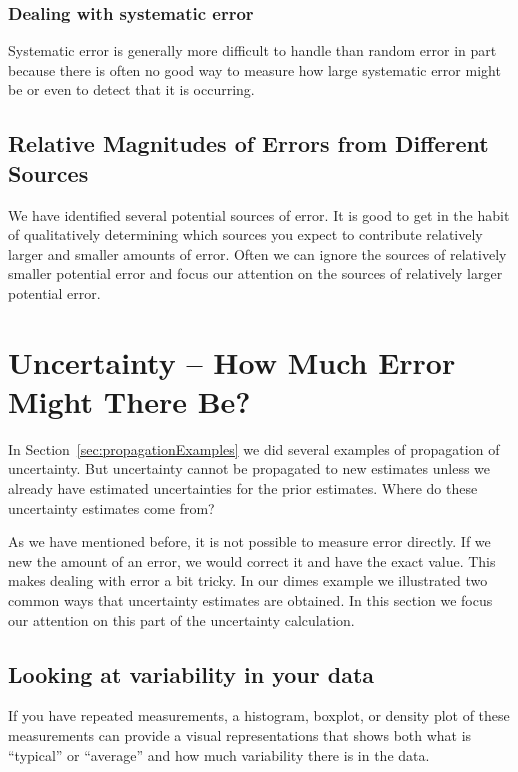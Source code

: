 \documentclass[twoside]{book}\usepackage[]{graphicx}\usepackage[]{xcolor}
\newcounter{example}[section]
\begin{document}
\subsubsection{Dealing with systematic error}
Systematic error is generally more difficult to handle than random error in
part because there is often no good way to measure how large systematic error
might be or even to detect that it is occurring.

\subsection{Relative Magnitudes of Errors from Different Sources}

We have identified several potential sources of error.  
It is good to get in the habit of qualitatively determining which sources you expect to contribute
relatively larger and smaller amounts of error.  Often we can ignore the sources of relatively
smaller potential error and focus our attention on the sources of relatively larger potential
error.


\section{Uncertainty -- How Much Error Might There Be?}

In Section~\ref{sec:propagationExamples} we did several examples of propagation of 
uncertainty.  But uncertainty cannot be propagated to new estimates unless we already
have estimated uncertainties for the prior estimates.  Where do these uncertainty estimates 
come from?

As we have mentioned before, it is not possible to measure error directly.  
If we new the amount of an error, we would correct it and have the exact value.  
This makes dealing with error a bit tricky.  In our dimes example we illustrated
two common ways that uncertainty estimates are obtained.  In this section we focus 
our attention on this part of the uncertainty calculation.

\subsection{Looking at variability in your data}

If you have repeated measurements, a histogram, boxplot, or density plot of these 
measurements can provide a 
visual representations that shows both what is ``typical'' or ``average'' and how much 
variability there is in the data.  
\end{document}
